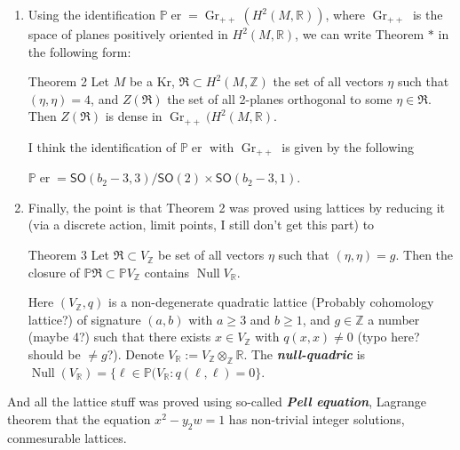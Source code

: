 \begin{enumerate}[label=\textbf{Step \arabic*}]
	\item 	Using the identification $\mathbb{P}\operatorname{er}=\operatorname{Gr}_{++}(H^{2}(M,\mathbb{R}))$, where $\operatorname{Gr}_{++}$ is the space of planes positively oriented in $H^{2}(M,\mathbb{R})$, we can write Theorem $*$ in the following form:
		\begin{thing4}{Theorem 2}\leavevmode
			Let $M$ be a Kr, $\mathfrak{R}\subset H^{2}(M,\mathbb{Z})$ the set of all vectors  $\eta$ such that $(\eta,\eta)=4$, and $Z(\mathfrak{R})$ the set of all 2-planes orthogonal to some $\eta\in\mathfrak{R}$. Then $Z(\mathfrak{R})$ is dense in $\operatorname{Gr}_{++}(H^{2}(M,\mathbb{R})$.
		\end{thing4}

		\begin{remark}\leavevmode
			I think the identification of $\mathbb{P}\operatorname{er}$ with $\operatorname{Gr}_{++}$ is given by the following
			\begin{claim}\leavevmode
				$\mathbb{P}\operatorname{er}=\mathsf{SO}(b_2-3,3) /\mathsf{SO}(2) \times \mathsf{SO}(b_2-3,1)$.
			\end{claim}
		\end{remark}

		\item Finally, the point is that Theorem 2 was proved using lattices by reducing it (via a discrete action, limit points, I still don't get this part) to
			\begin{thing1}{Theorem 3}\leavevmode
				Let $\mathfrak{R}\subset V_\mathbb{Z}$ be set of all vectors $\eta$ such that $(\eta,\eta)=g$. Then the closure of $\mathbb{P}\mathfrak{R}\subset \mathbb{P}V_\mathbb{Z}$ contains $\operatorname{Nu l l}V_{\mathbb{R}}$.
			
				Here $(V_\mathbb{Z},q)$ is a non-degenerate quadratic lattice {\color{7}(Probably cohomology lattice?)} of signature $(a,b)$ with $a\geq 3$ and $b\geq 1$, and $g\in\mathbb{Z}$ a number {\color{7}(maybe 4?)} such that there exists $x\in V_{\mathbb{Z}} $ with $q(x,x)\neq 0$ {\color{7}(typo here? should be $\neq g$?)}. Denote $V_\mathbb{R}:=V_\mathbb{Z}\otimes_{\mathbb{Z}}\mathbb{R}$. The \textit{\textbf{null-quadric}} is $\operatorname{Nu l l}(V_\mathbb{R})=\{\ell\in\mathbb{P}(V_{\mathbb{R}}:q(\ell,\ell)=0\} $.
			\end{thing1}
\end{enumerate}

And all the lattice stuff was proved using so-called \textit{\textbf{Pell equation}}, Lagrange theorem that the equation  $x^2-y_2w=1$ has non-trivial integer solutions, conmesurable lattices.

